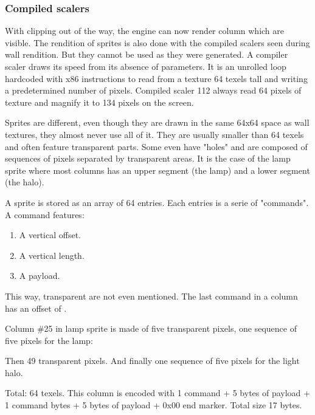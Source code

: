 \subsubsection{Compiled scalers}
With clipping out of the way, the engine can now render column which are visible. The rendition of sprites is also done with the compiled scalers seen during wall rendition. But they cannot be used as they were generated. A compiler scaler draws its speed from its absence of parameters. It is  an unrolled loop hardcoded with x86 instructions to read from a texture 64 texels tall and writing a predetermined number of pixels. Compiled scaler 112 always read 64 pixels of texture and magnify it to 134 pixels on the screen.\\
\par
\par
Sprites are different, even though they are drawn in the same 64x64 space as wall textures, they almost never use all of it. They are usually smaller than 64 texels and often feature transparent parts. Some even have "holes" and are composed of sequences of pixels separated by transparent areas. It is the case of the lamp sprite where most columns has an upper segment (the lamp) and a lower segment (the halo).\\
\par
A sprite is stored as an array of 64 entries. Each entries is a serie of "commands". A command features:
\begin{enumerate}
 \item A vertical offset.
 \item A vertical length.
 \item A payload.
 \end{enumerate}
\par
This way, transparent are not even mentioned. The last command in a column has an offset of .\\
\par

\begin{minipage}{.5\textwidth}
 Column \#25 in lamp sprite is made of five transparent pixels, one sequence of five pixels for the lamp:\\
\par
{}
\par
Then 49 transparent pixels. And finally one sequence of five pixels for the light halo.\\
\par
{}
\par
Total: 64 texels. This column is encoded with 1 command + 5 bytes of payload + 1 command bytes + 5 bytes of payload + 0x00 end marker. Total size 17 bytes.
 \end{minipage}
\begin{minipage}{.5\textwidth}
\begin{figure}[H]
  \begin{flushright}
   \end{flushright}
\end{figure}
\end{minipage}



